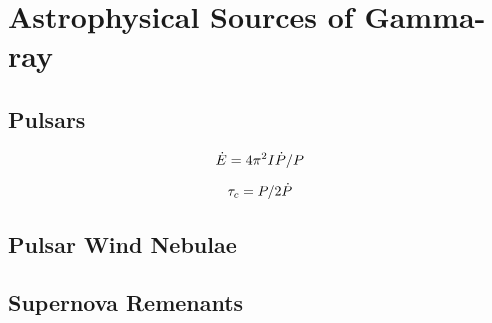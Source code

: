 
\section{Astrophysical Sources of Gamma-ray}
\subsection{Pulsars}

\begin{equation}
  \dot{E} = 
  4\pi^2 I \dot{P}/P
\end{equation}

\begin{equation}
  \tau_c = P/2\dot{P}
\end{equation}


\subsection{Pulsar Wind Nebulae}
\subsection{Supernova Remenants}

